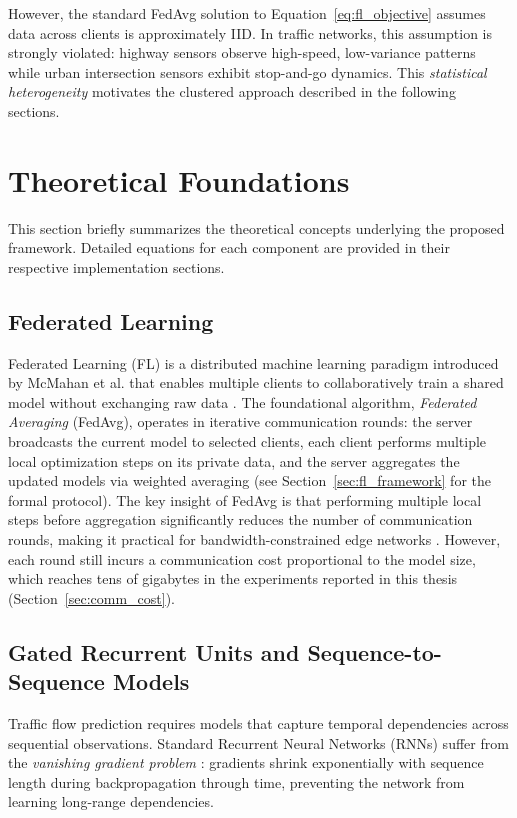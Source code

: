 However, the standard FedAvg solution to Equation~\ref{eq:fl_objective} assumes data across clients is approximately IID. In traffic networks, this assumption is strongly violated: highway sensors observe high-speed, low-variance patterns while urban intersection sensors exhibit stop-and-go dynamics. This \textit{statistical heterogeneity} motivates the clustered approach described in the following sections.

\section{Theoretical Foundations}
\label{sec:foundations}

This section briefly summarizes the theoretical concepts underlying the proposed framework. Detailed equations for each component are provided in their respective implementation sections.

\subsection{Federated Learning}
\label{sec:fl_theory}

Federated Learning (FL) is a distributed machine learning paradigm introduced by McMahan et al. \cite{mcmahan2017} that enables multiple clients to collaboratively train a shared model without exchanging raw data \cite{kairouz2021}. The foundational algorithm, \textit{Federated Averaging} (FedAvg), operates in iterative communication rounds: the server broadcasts the current model to selected clients, each client performs multiple local optimization steps on its private data, and the server aggregates the updated models via weighted averaging (see Section~\ref{sec:fl_framework} for the formal protocol). The key insight of FedAvg is that performing multiple local steps before aggregation significantly reduces the number of communication rounds, making it practical for bandwidth-constrained edge networks \cite{konecny2016}. However, each round still incurs a communication cost proportional to the model size, which reaches tens of gigabytes in the experiments reported in this thesis (Section~\ref{sec:comm_cost}).

\subsection{Gated Recurrent Units and Sequence-to-Sequence Models}
\label{sec:gru_theory}

Traffic flow prediction requires models that capture temporal dependencies across sequential observations. Standard Recurrent Neural Networks (RNNs) suffer from the \textit{vanishing gradient problem} \cite{hochreiter1997}: gradients shrink exponentially with sequence length during backpropagation through time, preventing the network from learning long-range dependencies.

